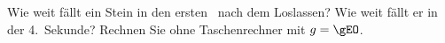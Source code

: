 Wie weit fällt ein Stein in den ersten \tvO\ nach dem Loslassen? Wie weit fällt er in der 4.~Sekunde? Rechnen Sie ohne Taschenrechner mit $g = \gEO$.
